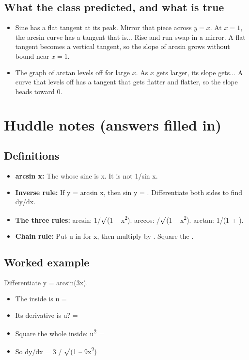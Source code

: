 \documentclass[11pt]{article}
\begin{document}
\subsection*{What the class predicted, and what is true}\begin{itemize}
\item Sine has a flat tangent at its peak. Mirror that piece across $y=x$. At $x=1$, the arcsin curve has a tangent that is...  Rise and run swap in a mirror. A flat tangent becomes a vertical tangent, so the slope of arcsin grows without bound near $x=1$.
\item The graph of arctan levels off for large $x$. As $x$ gets larger, its slope gets...  A curve that levels off has a tangent that gets flatter and flatter, so the slope heads toward 0.
\end{itemize}
\section*{Huddle notes (answers filled in)}
\subsection*{Definitions}\begin{itemize}
\item \textbf{arcsin x:} The  whose sine is x. It is not 1/sin x.
\item \textbf{Inverse rule:} If y = arcsin x, then sin y = . Differentiate both sides to find dy/dx.
\item \textbf{The three rules:} arcsin: 1/$\surd$(1 -- x\textsuperscript{2}). arccos: /$\surd$(1 -- x\textsuperscript{2}). arctan: 1/(1 + ).
\item \textbf{Chain rule:} Put u in for x, then multiply by . Square the .
\end{itemize}
\subsection*{Worked example}
Differentiate y = arcsin(3x).\\
\begin{itemize}
\item The inside is u = 
\item Its derivative is u? = 
\item Square the whole inside: u\textsuperscript{2} = 
\item So dy/dx = 3 / $\surd$(1 -- 9x\textsuperscript{2})
\end{itemize}
\end{document}
